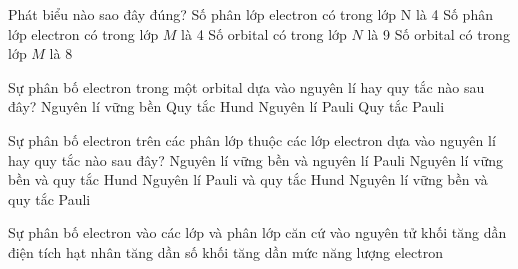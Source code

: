 \begin{vdex}
	Phát biểu nào sao đây đúng?
	\choice
	{\True Số phân lớp electron có trong lớp N là 4}
	{Số phân lớp electron có trong lớp $M$ là 4}
	{Số orbital có trong lớp $N$ là 9}
	{Số orbital có trong lớp $M$ là 8}
\end{vdex}
\begin{vd}
	Sự phân bố electron trong một orbital dựa vào nguyên lí hay quy tắc nào sau đây?
	\choice
	{Nguyên lí vững bền}
	{Quy tắc Hund}
	{\True Nguyên lí Pauli}
	{Quy tắc Pauli}
	
\end{vd}

\begin{vdex}
	Sự phân bố electron trên các phân lớp thuộc các lớp electron dựa vào nguyên lí hay quy tắc nào sau đây?
	\choice
	{Nguyên lí vững bền và nguyên lí Pauli}
	{\True Nguyên lí vững bền và quy tắc Hund}
	{Nguyên lí Pauli và quy tắc Hund}
	{Nguyên lí vững bền và quy tắc Pauli}
\end{vdex}

\begin{vdex}
	Sự phân bố electron vào các lớp và phân lớp căn cứ vào
	\choice
	{nguyên tử khối tăng dần}
	{điện tích hạt nhân tăng dần}
	{số khối tăng dần}
	{\True mức năng lượng electron}
	\loigiai{}
\end{vdex}


